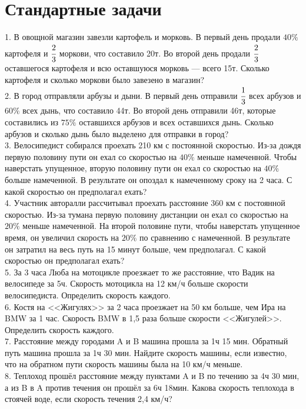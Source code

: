 \section{Стандартные задачи}
1. В овощной магазин завезли картофель и морковь. В первый день продали $40\%$ картофеля и $\cfrac{2}{3}$ моркови, что составило 20т. Во второй день продали $\cfrac{2}{3}$ оставшегося картофеля и всю оставшуюся морковь --- всего 15т. Сколько картофеля и сколько моркови было завезено в магазин?\\
2. В город отправляли арбузы и дыни. В первый день отправили $\cfrac{1}{3}$ всех арбузов и $60\%$ всех дынь, что составило 44т. Во второй день отправили 46т, которые составились из $75\%$ оставшихся арбузов и всех оставшихся дынь. Сколько арбузов и сколько дынь было выделено для отправки в город?\\
3. Велосипедист собирался проехать 210 км с постоянной скоростью. Из-за дождя первую половину пути он ехал со скоростью на $40\%$ меньше намеченной. Чтобы наверстать упущенное, вторую половину пути он ехал со скоростью на $40\%$ больше намеченной. В результате он опоздал к намеченному сроку на 2 часа. С какой скоростью он предполагал ехать?\\
4. Участник авторалли рассчитывал проехать расстояние 360 км с постоянной скоростью. Из-за тумана первую половину дистанции он ехал со скоростью на $20\%$ меньше намеченной. На второй половине пути, чтобы наверстать упущенное время, он увеличил скорость на $20\%$ по сравнению с намеченной. В результате он затратил на весь путь на 15 минут больше, чем предполагал. С какой скоростью он предполагал ехать?\\
5. За 3 часа Люба на мотоцикле проезжает то же расстояние,  что Вадик на велосипеде за 5ч. Скорость мотоцикла на 12 км/ч больше скорости велосипедиста. Определить скорость каждого.\\
6. Костя на <<Жигулях>> за 2 часа проезжает на 50 км больше, чем Ира на BMW за 1 час. Скорость BMW в 1,5 раза больше скорости <<Жигулей>>. Определить скорость каждого.\\
7. Расстояние между городами A и B машина прошла за 1ч 15 мин. Обратный путь машина прошла за 1ч 30 мин. Найдите скорость машины, если известно, что на обратном пути скорость машины была на 10 км/ч меньше.\\
8. Теплоход прошёл расстояние между пунктами A и B по течению за 4ч 30 мин, а из B в A против течения он прошёл за 6ч 18мин. Какова скорость теплохода в стоячей воде, если скорость течения 2,4 км/ч?\\
